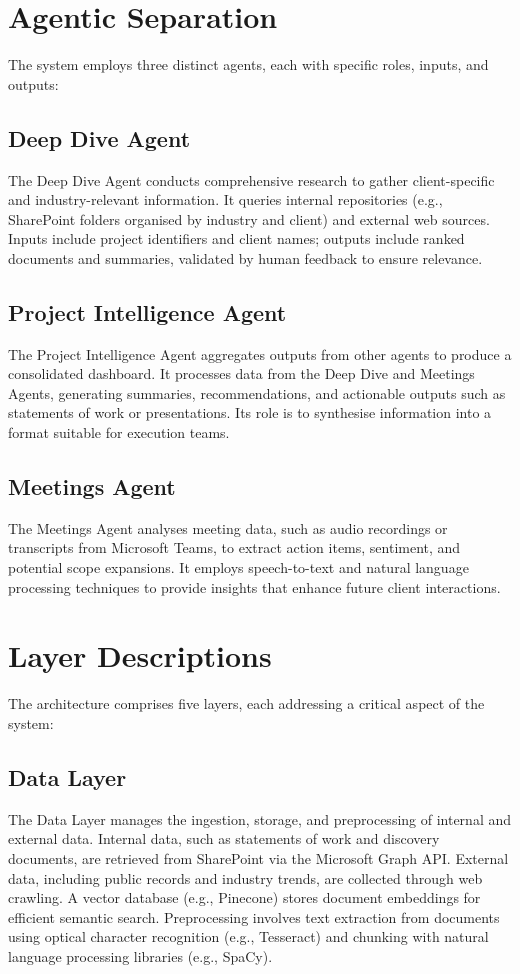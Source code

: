 \documentclass{article}
\begin{document}
\section{Agentic Separation}
The system employs three distinct agents, each with specific roles, inputs, and outputs:

\subsection{Deep Dive Agent}
The Deep Dive Agent conducts comprehensive research to gather client-specific and industry-relevant information. It queries internal repositories (e.g., SharePoint folders organised by industry and client) and external web sources. Inputs include project identifiers and client names; outputs include ranked documents and summaries, validated by human feedback to ensure relevance.

\subsection{Project Intelligence Agent}
The Project Intelligence Agent aggregates outputs from other agents to produce a consolidated dashboard. It processes data from the Deep Dive and Meetings Agents, generating summaries, recommendations, and actionable outputs such as statements of work or presentations. Its role is to synthesise information into a format suitable for execution teams.

\subsection{Meetings Agent}
The Meetings Agent analyses meeting data, such as audio recordings or transcripts from Microsoft Teams, to extract action items, sentiment, and potential scope expansions. It employs speech-to-text and natural language processing techniques to provide insights that enhance future client interactions.

\section{Layer Descriptions}
The architecture comprises five layers, each addressing a critical aspect of the system:

\subsection{Data Layer}
The Data Layer manages the ingestion, storage, and preprocessing of internal and external data. Internal data, such as statements of work and discovery documents, are retrieved from SharePoint via the Microsoft Graph API. External data, including public records and industry trends, are collected through web crawling. A vector database (e.g., Pinecone) stores document embeddings for efficient semantic search. Preprocessing involves text extraction from documents using optical character recognition (e.g., Tesseract) and chunking with natural language processing libraries (e.g., SpaCy).
\end{document}
